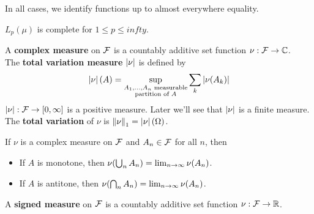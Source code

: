 \documentclass{article}
\begin{document}
In all cases, we identify functions up to almost everywhere equality.

\begin{nthm}
  $L_p(\mu)$ is complete for $1 \le p \le infty$.
\end{nthm}

\begin{defi}
  A {\bf complex measure} on $\mathcal F$ is a countably additive set function $\nu : \mathcal F \rightarrow \mathbb C$. \\
  The {\bf total variation measure} $\left\lvert \nu\right\rvert$ is defined by
  $$\left\lvert \nu\right\rvert(A) = \sup_{\substack{A_1, \dots, A_n \text{ measurable} \\ \text{partition of } A}} \sum_k \left\lvert \nu(A_k)\right\rvert$$
  $\left\lvert \nu\right\rvert : \mathcal F \rightarrow [0, \infty]$ is a positive measure. Later we'll see that $\left\lvert \nu\right\rvert$ is a finite measure. \\
  The {\bf total variation} of $\nu$ is $\left\lVert \nu\right\rVert_1 = \left\lvert \nu\right\rvert(\Omega)$.
\end{defi}

\begin{prop}
  If $\nu$ is a complex measure on $\mathcal F$ and $A_n \in \mathcal F$ for all $n$, then
  \begin{itemize}
    \item If $A$ is monotone, then $\nu(\bigcup_n A_n) = \lim_{n \rightarrow \infty} \nu(A_n)$.
    \item If $A$ is antitone, then $\nu(\bigcap_n A_n) = \lim_{n \rightarrow \infty} \nu(A_n)$.
  \end{itemize}
\end{prop}

\begin{defi}
  A {\bf signed measure} on $\mathcal F$ is a countably additive set function $\nu : \mathcal F \rightarrow \mathbb R$.
\end{defi}
\end{document}
